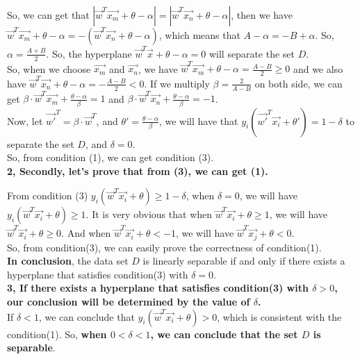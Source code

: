 \begin{enumerate}
\begin{enumerate}
\begin{enumerate}
So, we can get that $|\vec{w}^T \vec{x_m} + \theta - \alpha| = |\vec{w}^T \vec{x_n} + \theta - \alpha|$, then we have $\vec{w}^T \vec{x_m} + \theta - \alpha = -(\vec{w}^T \vec{x_n} + \theta - \alpha)$, which means that $ A - \alpha = - B + \alpha$. So, $ \alpha = \frac{A + B}{2}$. So, the hyperplane $\vec{w}^T \vec{x} + \theta - \alpha = 0$ will separate the set $D$. \\

So, when we choose $\vec{x_m}$ and $\vec{x_n}$, we have $\vec{w}^T \vec{x_m} + \theta - \alpha = \frac{A - B}{2} \ge 0$ and we also have $\vec{w}^T \vec{x_n} + \theta - \alpha = -\frac{A - B}{2} < 0$. If we multiply $\beta = \frac{2}{A - B}$ on both side, we can get $\beta \cdot \vec{w}^T \vec{x_m} + \frac{\theta - \alpha}{\beta} = 1$ and $\beta \cdot \vec{w}^T \vec{x_n} + \frac{\theta - \alpha}{\beta} = -1$.\\ 

Now, let $ \vec{w'}^T = \beta \cdot \vec{w}^T$, and $\theta' = \frac{\theta - \alpha}{\beta}$, we will have that $y_i(\vec{w'}^T \vec{x_i} + \theta') = 1 - \delta$ to separate the set $D$, and $\delta = 0$.\\

So, from condition (1), we can get condition (3).\\

{\bf 2, Secondly, let's prove that from (3), we can get (1).\\}

From condition (3) $y_i(\vec{w}^T \vec{x_i} + \theta) \geq 1 - \delta$, when $\delta = 0$, we will have $y_i(\vec{w}^T \vec{x_i} + \theta) \geq 1$. It is very obvious that when $\vec{w}^T \vec{x_i} + \theta \geq 1$, we will have $\vec{w}^T \vec{x_i} + \theta \geq 0$. And when $\vec{w}^T \vec{x_i} + \theta < -1$, we will have $\vec{w}^T \vec{x_j} + \theta < 0$.\\

So, from condition(3), we can easily prove the correctness of condition(1).\\

{\bf In conclusion}, the data set $D$ is linearly separable if and only if there exists a hyperplane that satisfies condition(3) with $\delta = 0$.\\

{\bf 3, If there exists a hyperplane that satisfies condition(3) with $\delta > 0$, our conclusion will be determined by the value of $\delta$.}\\

If $\delta < 1$, we can conclude that $y_i(\vec{w}^T \vec{x_i} + \theta) > 0$, which is consistent with the condition(1). So, {\bf when $0 < \delta < 1$, we can conclude that the set $D$ is separable}.\\


\end{enumerate}
\end{enumerate}
\end{enumerate}
